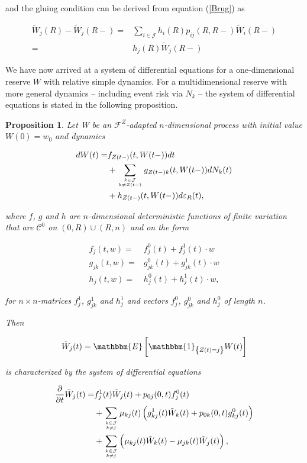 \documentclass{book}
\newcommand{\1}[1]{\mathbbm{1}_{\left\lbrace #1 \right\rbrace}}
\newcommand{\expec}[1][def]{\mathbbm{E} \left[ #1 \right]}
\theoremstyle{break}
\newtheorem{proposition}[definition]{Proposition}%
\theoremstyle{remark}
\numberwithin{equation}{section}
\begin{document}
and the gluing condition can be derived from equation (\ref{Brug}) as

\begin{align*}
	\tilde{W}_j(R) - \tilde{W}_j(R-) =& \sum_{i \in \mathcal{J}} h_{i}(R) p_{ij}(R,R-) \tilde{W}_i(R-) \\
	=& h_{j}(R) \tilde{W}_j(R-)
\end{align*}

We have now arrived at a system of differential equations for a one-dimensional reserve $W$ with relative simple dynamics. For a multidimensional reserve with more general dynamics -- including event risk via $N_k$ -- the system of differential equations is stated in the following proposition.

\begin{proposition} \label{MainResult}
	Let W be an $\mathcal{F}^{Z}$-adapted $n$-dimensional process with initial value $W(0)=w_0$ and dynamics
	
	\begin{align} \label{WDynamics}
\begin{split}
		dW(t) =& f_{Z(t-)}(t,W(t-)) dt \\
	&+ \sum_{k \in \mathcal{J} \atop k \neq Z(t-)} g_{Z(t-)k}(t,W(t-)) dN_{k}(t) \\
	&+ h_{Z(t-)}(t,W(t-)) d \varepsilon_R(t),
\end{split}
	\end{align}
	
	where $f$, $g$ and $h$ are $n$-dimensional deterministic functions of finite variation that are $\mathcal{C}^0$ on $(0,R) \cup (R,n)$ and on the form
	
	\begin{align*}
	f_j(t,w) =& f_j^0(t) + f_j^1(t) \cdot w \\
	g_{jk}(t,w) =& g_{jk}^0(t) + g_{jk}^1(t) \cdot w \\
	h_j(t,w) =& h_j^0(t) + h_j^1(t) \cdot w,
	\end{align*}
	
	for $n \times n$-matrices $f_j^1$, $g_{jk}^1$ and $ h_j^1$ and vectors $f_j^0$, $g_{jk}^0$ and $ h_j^0$ of length $n$.
	
	Then
	
	\begin{align*}
	\tilde{W}_j(t) = \expec[\1{Z(t)=j} W(t)]
	\end{align*}
	
	is characterized by the system of differential equations
	
	\begin{align*}
	\frac{\partial}{\partial t} \tilde{W}_j(t) =& f_j^1(t) \tilde{W}_j(t) + p_{0j}(0,t) f_j^0(t) \\
	&+ \sum_{k \in \mathcal{J} \atop k \neq j} \mu_{kj}(t) \left( g_{kj}^1(t) \tilde{W}_k(t) + p_{0k}(0,t) g_{kj}^0(t) \right) \\
	&+ \sum_{k \in \mathcal{J} \atop k \neq j} \left( \mu_{kj}(t) \tilde{W}_k(t) - \mu_{jk}(t) \tilde{W}_j(t) \right),
	\end{align*}
	

\end{proposition}
\end{document}
